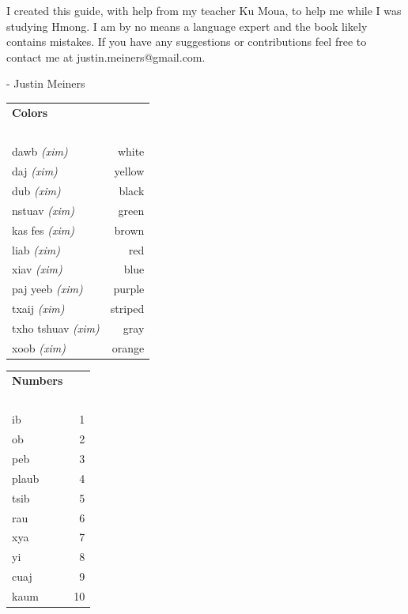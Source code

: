 \documentclass{article}
\begin{document}
I created this guide, with help from my teacher Ku Moua, to help me while I was studying Hmong.
I am by no means a language expert and the book likely contains mistakes. If you have any suggestions or contributions feel free to contact me at justin.meiners@gmail.com.

\hfill - Justin Meiners

\clearpage

\setcounter{page}{1}

\begin{multicols}{2}
[
\section*{}
\begin{center}\rule{\textwidth}{.4pt}\end{center}
]

\begin{tabular}{l r}
\textbf{Colors} \\
~\\

dawb {\em (xim)} &white\\
daj {\em (xim)} &yellow\\
dub {\em (xim)} &black\\
nstuav {\em (xim)} &green\\
kas fes {\em (xim)} &brown\\
liab {\em (xim)} &red\\
xiav {\em (xim)} &blue\\
paj yeeb {\em (xim)} &purple\\
txaij {\em (xim)} &striped\\
txho tshuav {\em (xim)} &gray\\
xoob {\em (xim)} &orange\\
\end{tabular}

\begin{tabular}{l r}
\textbf{Numbers} \\
~\\
ib &1\\
ob &2\\
peb &3\\
plaub &4\\
tsib &5\\
rau &6\\
xya &7\\
yi &8\\
cuaj &9\\
kaum &10\\
\end{tabular}
\end{multicols}
\end{document}
